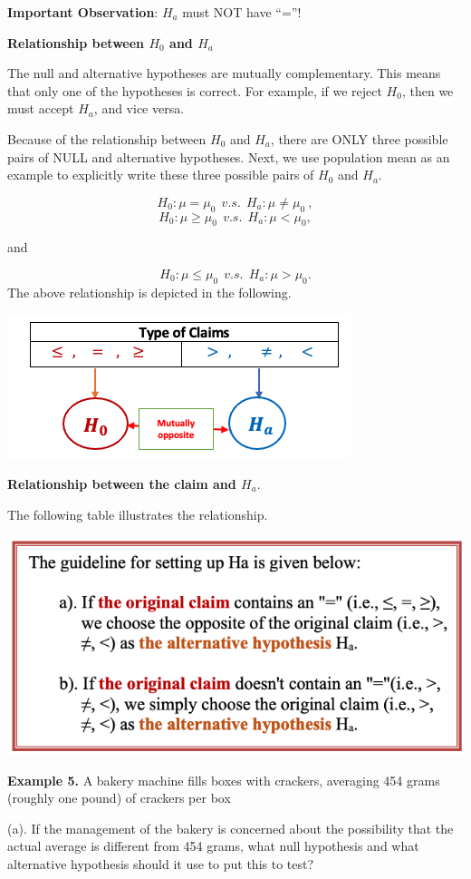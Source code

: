 \documentclass[
]{book}
\begin{document}
\textbf{Important Observation}: \(H_a\) must NOT have ``=''!

\textbf{Relationship between \(H_0\) and \(H_a\)}

The null and alternative hypotheses are mutually complementary. This means that only one of the hypotheses is correct.
For example, if we reject \(H_0\), then we must accept \(H_a\), and vice versa.

Because of the relationship between \(H_0\) and \(H_a\), there are ONLY three possible pairs of NULL and alternative hypotheses. Next, we use population mean as an example to explicitly write these three possible pairs of \(H_0\) and \(H_a\).

\[
H_0: \mu = \mu_0  \ \ v.s. \ \ H_a: \mu \ne \mu_0 \ ,
\]
\[
H_0: \mu \ge \mu_0  \ \ v.s. \ \ H_a: \mu < \mu_0,
\]

and

\[
H_0: \mu \le  \mu_0  \ \ v.s. \ \ H_a: \mu > \mu_0.
\]
The above relationship is depicted in the following.

\begin{center}\includegraphics[width=0.45\linewidth]{week08/claimVSH0Ha} \end{center}

\hfill\break

\textbf{Relationship between the claim and \(H_a\)}.

The following table illustrates the relationship.

\begin{center}\includegraphics[width=0.55\linewidth]{week08/settingUpHoHa} \end{center}

\textbf{Example 5. } A bakery machine fills boxes with crackers, averaging 454 grams (roughly one pound) of crackers per box

(a). If the management of the bakery is concerned about the possibility that the actual average is different from 454 grams, what null hypothesis and what alternative hypothesis should it use to put this to test?
\end{document}
